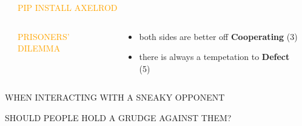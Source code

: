 \documentclass[usenames,dvipsnames,t]{beamer}
\begin{document}
\begin{frame}[fragile]

\begin{columns}
  \begin{column}{.03\linewidth}
  \end{column}
  \begin{column}{.45\linewidth}
   \vspace{1cm}

    \centering
    {\fontsize{120}{130}\selectfont\textcolor{orange}{PIP \hspace{2.5cm} INSTALL \hspace{2cm} AXELROD}}

  \begin{columns}
  \begin{column}{.40\linewidth}

   \vspace{1cm}

    \centering
    \textcolor{orange}{\LARGE{PRISONERS' DILEMMA}}
  \end{column}
  \begin{column}{.55\linewidth}
    \large{
    \begin{itemize}
      \item both sides are better off \textbf{Cooperating} (3)
      \item there is always a tempetation to \textbf{Defect} (5)
    \end{itemize}
    }
    \end{column}
    \end{columns}
  \end{column}
  \begin{column}{.30\linewidth}

 \hspace{9cm}  
  \end{column}
  \end{columns}
  \begin{columns}
    \begin{column}{.25\linewidth}
   \vspace{1cm}

\begin{center}
\Large{\textcolor{red!80}{WHEN INTERACTING WITH A SNEAKY OPPONENT}}
\end{center}
\begin{center}
\Large{\textcolor{red!80}{SHOULD PEOPLE HOLD A GRUDGE AGAINST THEM?}}
\end{center}


\end{column}
\end{columns}
\end{frame}
\end{document}
